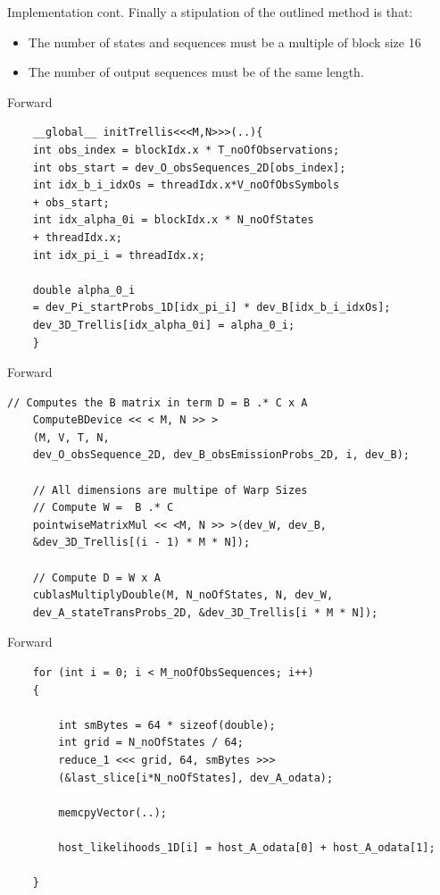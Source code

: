 \documentclass[11pt]{beamer}
\begin{document}
\begin{frame}{Implementation cont.}
Finally a stipulation of the outlined method is that:

\begin{itemize}
\item The number of states and sequences must be a multiple of block size 16
\item The number of output sequences must be of the same length.
\end{itemize}
\end{frame}

\begin{frame}[fragile]{Forward}
\begin{verbatim}
	__global__ initTrellis<<<M,N>>>(..){
	int obs_index = blockIdx.x * T_noOfObservations;
	int obs_start = dev_O_obsSequences_2D[obs_index];
	int idx_b_i_idxOs = threadIdx.x*V_noOfObsSymbols 
	+ obs_start;
	int idx_alpha_0i = blockIdx.x * N_noOfStates 
	+ threadIdx.x;
	int idx_pi_i = threadIdx.x;

	double alpha_0_i 
	= dev_Pi_startProbs_1D[idx_pi_i] * dev_B[idx_b_i_idxOs];
	dev_3D_Trellis[idx_alpha_0i] = alpha_0_i;
	}

\end{verbatim}
\end{frame}

\begin{frame}[fragile]{Forward}
\begin{verbatim}
// Computes the B matrix in term D = B .* C x A
	ComputeBDevice << < M, N >> >
	(M, V, T, N, 
	dev_O_obsSequence_2D, dev_B_obsEmissionProbs_2D, i, dev_B);

	// All dimensions are multipe of Warp Sizes
	// Compute W =  B .* C
	pointwiseMatrixMul << <M, N >> >(dev_W, dev_B,
	&dev_3D_Trellis[(i - 1) * M * N]);

	// Compute D = W x A
	cublasMultiplyDouble(M, N_noOfStates, N, dev_W, 
	dev_A_stateTransProbs_2D, &dev_3D_Trellis[i * M * N]);
\end{verbatim}
\end{frame}

\begin{frame}[fragile]{Forward}
\begin{verbatim}
	for (int i = 0; i < M_noOfObsSequences; i++)
	{

		int smBytes = 64 * sizeof(double);
		int grid = N_noOfStates / 64;
		reduce_1 <<< grid, 64, smBytes >>>
		(&last_slice[i*N_noOfStates], dev_A_odata);

		memcpyVector(..);

		host_likelihoods_1D[i] = host_A_odata[0] + host_A_odata[1];

	}
\end{verbatim}
\end{frame}
\end{document}
